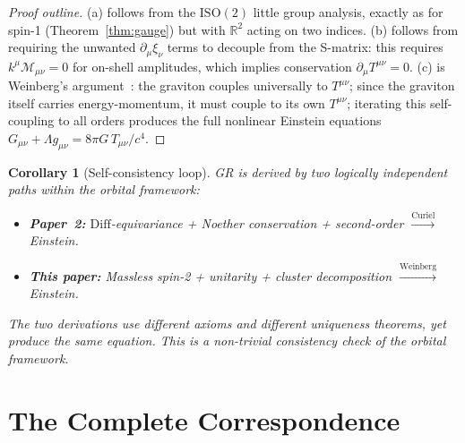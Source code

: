 \documentclass[12pt]{article}
\theoremstyle{plain}
\newtheorem{corollary}[theorem]{Corollary}
\theoremstyle{definition}
\theoremstyle{remark}
\newcommand{\ISO}{\mathrm{ISO}}
\newcommand{\Diff}{\mathrm{Diff}}
\begin{document}
\begin{proof}[Proof outline]
(a) follows from the $\ISO(2)$ little group analysis, exactly as for spin-1 (Theorem~\ref{thm:gauge}) but with $\mathbb{R}^2$ acting on two indices. (b) follows from requiring the unwanted $\partial_\mu\xi_\nu$ terms to decouple from the S-matrix: this requires $k^\mu \mathcal{M}_{\mu\nu} = 0$ for on-shell amplitudes, which implies conservation $\partial_\mu T^{\mu\nu} = 0$. (c) is Weinberg's argument~\cite{weinberg1964b}: the graviton couples universally to $T^{\mu\nu}$; since the graviton itself carries energy-momentum, it must couple to its own $T^{\mu\nu}$; iterating this self-coupling to all orders produces the full nonlinear Einstein equations $G_{\mu\nu} + \Lambda g_{\mu\nu} = 8\pi G\,T_{\mu\nu}/c^4$.
\end{proof}

\begin{corollary}[Self-consistency loop]\label{cor:loop}
GR is derived by two logically independent paths within the orbital framework:
\begin{itemize}
    \item \textbf{Paper~2:} $\Diff$-equivariance + Noether conservation + second-order $\xrightarrow{\text{Curiel}}$ Einstein.
    \item \textbf{This paper:} Massless spin-2 + unitarity + cluster decomposition $\xrightarrow{\text{Weinberg}}$ Einstein.
\end{itemize}
The two derivations use different axioms and different uniqueness theorems, yet produce the same equation. This is a non-trivial \emph{consistency check} of the orbital framework.
\end{corollary}


\section{The Complete Correspondence}
\label{sec:correspondence}
\end{document}
